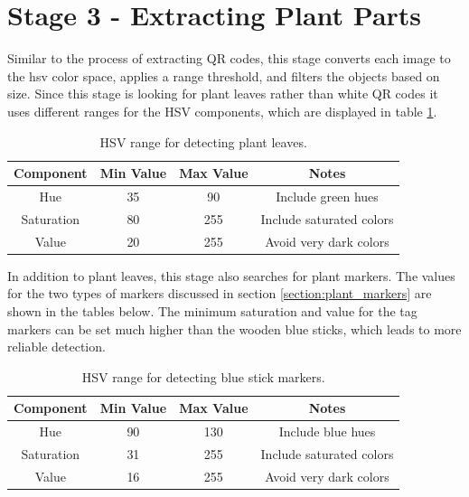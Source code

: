 \section{Stage 3 - Extracting Plant Parts}
\label{processing-stage3}

Similar to the process of extracting QR codes, this stage converts each image to the \ac{hsv} color space, applies a range threshold, and filters the objects based on size.  Since this stage is looking for plant leaves rather than white QR codes it uses different ranges for the HSV components, which are displayed in table \ref{table:plant_leaves_hsv_ranges}.  

\begin{table}[htb]
    \begin{center}
    \caption[Plant Leaf Detection Values]{HSV range for detecting plant leaves.}
    \begin{tabular}[c]{|c|c|c|c|}
        \hline
        Component & Min Value & Max Value & Notes \\
        \hline
        Hue        & 35  & 90  & Include green hues        \\
        Saturation & 80  & 255 & Include saturated colors  \\
        Value      & 20  & 255 & Avoid very dark colors    \\
        \hline
    \end{tabular}
    \label{table:plant_leaves_hsv_ranges}
   \end{center}
\end{table}

In addition to plant leaves, this stage also searches for plant markers.  The values for the two types of markers discussed in section \ref{section:plant_markers} are shown in the tables below.  The minimum saturation and value for the tag markers can be set much higher than the wooden blue sticks, which leads to more reliable detection.   

\begin{table}[hb]
    \begin{center}
    \caption[Blue Stick Detection Values]{HSV range for detecting blue stick markers.}
    \begin{tabular}[c]{|c|c|c|c|}
        \hline
        Component & Min Value & Max Value & Notes \\
        \hline
        Hue        & 90  & 130 & Include blue hues        \\
        Saturation & 31  & 255 & Include saturated colors  \\
        Value      & 16  & 255 & Avoid very dark colors    \\
        \hline
    \end{tabular}
    \label{table:stick_hsv_ranges}
   \end{center}
\end{table}

